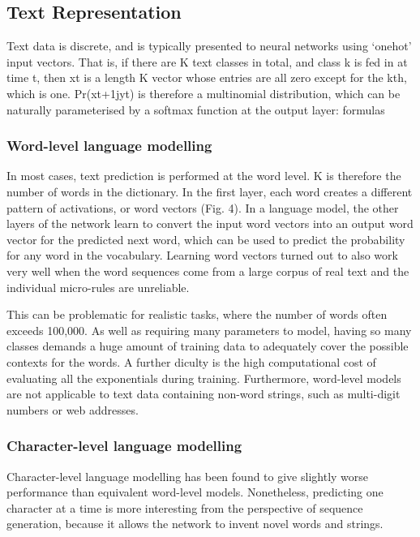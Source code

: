 \subsection{Text Representation}
Text data is discrete, and is typically presented to neural networks using `onehot' input vectors. That is, if there are K text classes in total, and class k is fed in at time t, then xt is a length K vector whose entries are all zero except for the kth, which is one. Pr(xt+1jyt) is therefore a multinomial distribution, which can be naturally parameterised by a softmax function at the output layer:
formulas

\subsubsection{Word-level language modelling}

In most cases, text prediction  is performed at the word level. K is therefore the number of words in the dictionary. \cite{graves2013generating}
In the first layer, each word creates a different pattern of activations, or word vectors (Fig. 4). In a language model, the other layers of the network learn to convert the input word vectors into an output word vector for the predicted next word, which can be used to predict the probability for any word in the vocabulary. Learning word vectors turned out to also work very well when the word sequences come from a large corpus of real text and the individual micro-rules are unreliable.\cite{lecun2015deep}

This can be problematic for realistic tasks, where the number of words often exceeds 100,000. As well as requiring many parameters to model, having so many classes demands a huge amount of training data to adequately cover the possible contexts for the words. A further diculty is the high computational cost of evaluating all the exponentials during training. Furthermore, word-level models are not applicable to text data containing non-word strings, such as multi-digit numbers or web addresses.\cite{graves2013generating}
\subsubsection{Character-level language modelling}

Character-level language modelling has been found to give slightly worse performance than equivalent word-level models. Nonetheless, predicting one character at a time is more interesting from the perspective of sequence generation, because it allows the network to invent novel words and strings.
\cite{graves2013generating}

